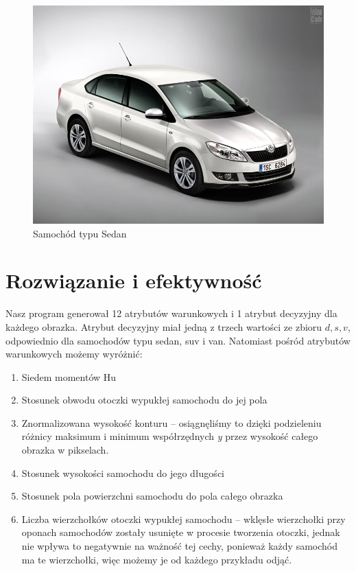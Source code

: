 \documentclass{article}
\begin{document}
\begin{figure}[H]
\begin{center}
\includegraphics[width=1\textwidth]{../imgs_easy/sedan_22.jpg}
\end{center}
\caption{Samochód typu Sedan}
\label{fig: wykres3}
\end{figure}
\section{Rozwiązanie i efektywność}
Nasz program generował 12 atrybutów warunkowych i 1 atrybut decyzyjny dla każdego obrazka. Atrybut decyzyjny miał jedną z trzech wartości ze zbioru ${d, s, v}$, odpowiednio dla samochodów typu sedan, suv i van. Natomiast pośród atrybutów warunkowych możemy wyróżnić:
\begin{enumerate}
\item Siedem momentów Hu
\item Stosunek obwodu otoczki wypukłej samochodu do jej pola
\item Znormalizowana wysokość konturu -- osiągnęliśmy to dzięki podzieleniu różnicy maksimum i minimum współrzędnych \textit{y} przez wysokość całego obrazka w pikselach.
\item Stosunek wysokości samochodu do jego długości
\item Stosunek pola powierzchni samochodu do pola całego obrazka
\item Liczba wierzchołków otoczki wypukłej samochodu -- wklęsłe wierzchołki przy oponach samochodów zostały usunięte w procesie tworzenia otoczki, jednak nie wpływa to negatywnie na ważność tej cechy, ponieważ każdy samochód ma te wierzchołki, więc możemy je od każdego przykładu odjąć.
\end{enumerate}
\end{document}
